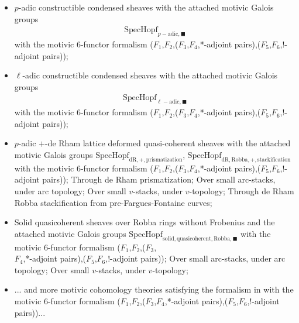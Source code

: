 \documentclass[12pt]{article}
\theoremstyle{definition}
\begin{document}
\begin{itemize}\setlength{\itemsep}{-0.1cm}
\item[A] $p$-adic constructible condensed sheaves with the attached motivic Galois groups 
\begin{align}
\mathrm{Spec}\mathrm{Hopf}_{p-\text{adic},\blacksquare}
\end{align}
with the motivic 6-functor formalism ($F_1$,$F_2$,($F_3$,$F_4$,*-adjoint pairs),($F_5$,$F_6$,!-adjoint pairs));
\item[B] $\ell$-adic constructible condensed sheaves with the attached motivic Galois groups 
\begin{align}
\mathrm{Spec}\mathrm{Hopf}_{\ell-\text{adic},\blacksquare}
\end{align}
with the motivic 6-functor formalism ($F_1$,$F_2$,($F_3$,$F_4$,*-adjoint pairs),($F_5$,$F_6$,!-adjoint pairs));
\item[C] $p$-adic $+$-de Rham lattice deformed quasi-coherent sheaves with the attached motivic Galois groups $\mathrm{Spec}\mathrm{Hopf}_{\mathrm{dR},+,\text{prismatization}}$, $\mathrm{Spec}\mathrm{Hopf}_{\mathrm{dR},\mathrm{Robba},+,\text{stackification}}$ with the motivic 6-functor formalism ($F_1$,$F_2$,($F_3$,$F_4$,*-adjoint pairs),($F_5$,$F_6$,!-adjoint pairs));
\subitem[C1] Through de Rham prismatization;
\subsubitem[C11] Over small arc-stacks, under arc topology;
\subsubitem[C12] Over small $v$-stacks, under $v$-topology;
\subitem[C2] Through de Rham Robba stackification from pre-Fargues-Fontaine curves;
\item[D] Solid quasicoherent sheaves over Robba rings without Frobenius and the attached motivic Galois groups $\mathrm{Spec}\mathrm{Hopf}_{\mathrm{solid}, \mathrm{quasicoherent},\mathrm{Robba},\blacksquare}$ with the motivic 6-functor formalism ($F_1$,$F_2$,($F_3$,\\$F_4$,*-adjoint pairs),($F_5$,$F_6$,!-adjoint pairs));
\subitem[D1] Over small arc-stacks, under arc topology;
\subitem[D2] Over small $v$-stacks, under $v$-topology;
\item[E] ... and more motivic cohomology theories satisfying the formalism in \cite{2A} with the motivic 6-functor formalism ($F_1$,$F_2$,($F_3$,$F_4$,*-adjoint pairs),($F_5$,$F_6$,!-adjoint pairs))...
\end{itemize}
\end{document}
